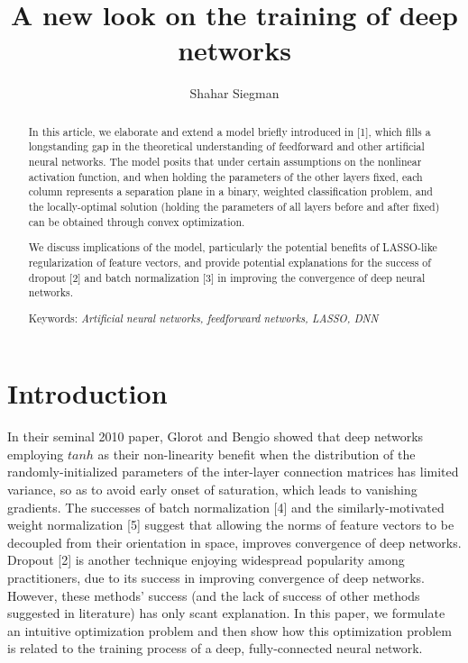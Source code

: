 \documentclass[]{article}
\title{A new look on the training of deep networks}
\author{Shahar Siegman}
\begin{document}
 	
 	\maketitle
 	
 	\begin{abstract}
 		In this article, we elaborate and extend a model briefly introduced in [1], which fills a longstanding gap in the theoretical understanding of feedforward and other artificial neural networks. The model posits that under certain assumptions on the nonlinear activation function, and when holding the parameters of the other layers fixed, each column represents a separation plane in a binary, weighted classification problem, and the locally-optimal solution (holding the parameters of all layers before and after fixed) can be obtained through convex optimization. 
 		
 		We discuss implications of the model, particularly the potential benefits of LASSO-like regularization of feature vectors, and provide potential explanations for the success of dropout [2] and batch normalization [3] in improving the convergence of deep neural networks.
 		
 		Keywords: \textit{Artificial neural networks, feedforward networks, LASSO, DNN}
 	\end{abstract}
 	
 	\section{Introduction}
 		In their seminal 2010 paper, Glorot and Bengio showed that deep networks employing $tanh$ as their non-linearity benefit when the distribution of the randomly-initialized parameters of the inter-layer connection matrices has limited variance, so as to avoid early onset of saturation, which leads to vanishing gradients. The successes of batch normalization [4] and the similarly-motivated weight normalization [5] suggest that allowing the norms of feature vectors to be decoupled from their orientation in space, improves convergence of deep networks. Dropout [2] is another technique enjoying widespread popularity among practitioners, due to its success in improving convergence of deep networks. However, these methods' success (and the lack of success of other methods suggested in literature) has only scant explanation. 
 		In this paper, we formulate an intuitive optimization problem and then show how this optimization problem is related to the training process of a deep, fully-connected neural network.
 		 
\end{document}
